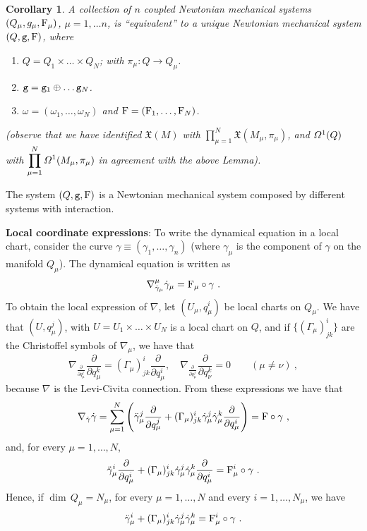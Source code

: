 \documentclass[12pt]{report}
\newtheorem{corol}[teor]{Corollary}
\def\beann{\begin{eqnarray*}}
\def\eeann{\end{eqnarray*}}
\def\ben{\begin{enumerate}}
\def\een{\end{enumerate}}
\def\dst{\displaystyle}
\def\derpar#1#2{\frac{\partial{#1}}{\partial{#2}}}
\def\moment#1#2#3{{#1}_{#2}, \ldots, {#1}_{#3}}
\def\vf{\mathfrak X}
\def\df{{\mit\Omega}}
\begin{document}
\begin{corol}
A collection of $n$ coupled Newtonian mechanical systems $(Q_\mu,g_\mu,{\rm F}_\mu)$, $\mu=1,\ldots n$, is ``equivalent'' to a unique Newtonian mechanical system $(Q,{\tt g},{\rm F})$, where
\ben
\item
$Q=Q_1\times\ldots\times Q_N$; with $\pi_\mu\colon Q\to Q_\mu$.
\item
${\tt g}={\tt g}_1\oplus\ldots {\tt g}_N$.
\item
$\omega=(\omega_1,\ldots ,\omega_N)$ and ${\rm F}=({\rm F}_1,\ldots ,{\rm F}_N)$.
\een
(observe that we have identified
$\vf (M)$ with \(\dst\prod_{\mu=1}^N\vf (M_\mu,\pi_\mu)\), and
$\df^1(Q)$ with \(\dst\prod_{\mu=1}^N\df^1 (M_\mu,\pi_\mu)\)
in agreement with the above Lemma).
\end{corol}

The system $(Q,{\tt g},{\rm F})$ is a Newtonian mechanical system composed by different systems with interaction.

{\bf Local coordinate expressions}:
To write the dynamical equation in a local chart, consider the curve $\gamma\equiv (\moment{\gamma}{1}{n})$
(where $\gamma_\mu$ is the component of $\gamma$ on the manifold $Q_\mu$). The dynamical equation is written as
$$
\nabla^\mu_{\dot\gamma_\mu}\dot\gamma_\mu={\rm F}_\mu\circ\gamma \ .
$$
To obtain the local expression of $\nabla$, let
$(U_\mu,q_\mu^i)$ be local charts on $Q_\mu$.
We have that $(U,q_\mu^j)$, with $U=U_1\times\ldots\times U_N$
is a local chart on $Q$, and if $\{ (\Gamma_\mu)_{jk}^i\}$
are the Christoffel symbols of $\nabla_\mu$,
we have that
$$
\nabla_{\derpar{}{q^j_\mu}}\derpar{}{q^k_\mu}=(\Gamma_\mu)_{jk}^i\derpar{}{q_\mu^i} ,\quad
\nabla_{\derpar{}{q^j_\mu}}\derpar{}{q^k_\nu}=0
\qquad (\mu\not=\nu ) \ ,
$$
because $\nabla$ is the Levi-Civita connection. From these expressions we have that
$$
\nabla_{\dot\gamma}\dot\gamma=
\sum_{\mu=1}^N\left(\ddot\gamma_\mu^j\derpar{}{q^j_\mu}+
(\Gamma_\mu)_{jk}^i\dot\gamma_\mu^j\dot\gamma_\mu^k
\derpar{}{q^i_\mu}\right) =
{\rm F}\circ\gamma \ ,
$$
and, for every $\mu=1,\ldots ,N$,
$$
\ddot\gamma_\mu^i\derpar{}{q^i_\mu}+
(\Gamma_\mu)_{jk}^i\dot\gamma_\mu^j\dot\gamma_\mu^k\derpar{}{q^i_\mu}=
{\rm F}^i_\mu\circ\gamma \ .
$$
Hence,  if $\dim\, Q_\mu=N_{\mu}$, for every $\mu=1,\ldots ,N$
and every $i=1,\ldots ,N_{\mu}$, we have 
$$
\ddot\gamma_\mu^i+
(\Gamma_\mu)_{jk}^i\dot\gamma_\mu^j\dot\gamma_\mu^k =
{\rm F}_\mu^i\circ\gamma \ .
$$
\end{document}
